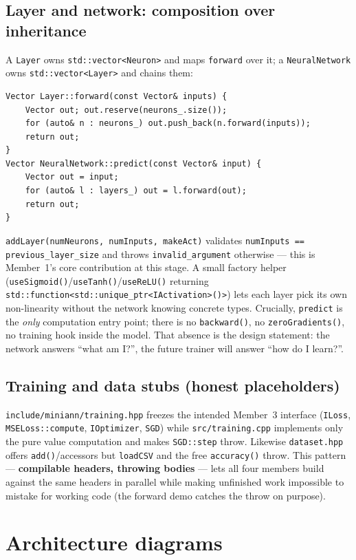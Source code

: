 \documentclass[11pt,a4paper]{article}
\begin{document}
\subsection{Layer and network: composition over inheritance}
A \texttt{Layer} owns \texttt{std::vector<Neuron>} and maps \texttt{forward} over it; a
\texttt{NeuralNetwork} owns \texttt{std::vector<Layer>} and chains them:
\begin{lstlisting}
Vector Layer::forward(const Vector& inputs) {
    Vector out; out.reserve(neurons_.size());
    for (auto& n : neurons_) out.push_back(n.forward(inputs));
    return out;
}
Vector NeuralNetwork::predict(const Vector& input) {
    Vector out = input;
    for (auto& l : layers_) out = l.forward(out);
    return out;
}
\end{lstlisting}
\texttt{addLayer(numNeurons, numInputs, makeAct)} validates
\texttt{numInputs == previous\_layer\_size} and throws \texttt{invalid\_argument} otherwise ---
this is Member~1's core contribution at this stage. A small factory helper
(\texttt{useSigmoid()}/\texttt{useTanh()}/\texttt{useReLU()} returning
\texttt{std::function<std::unique\_ptr<IActivation>()>}) lets each layer pick its own
non-linearity without the network knowing concrete types. Crucially, \texttt{predict} is the
\emph{only} computation entry point; there is no \texttt{backward()}, no \texttt{zeroGradients()},
no training hook inside the model. That absence is the design statement: the network answers
``what am I?'', the future trainer will answer ``how do I learn?''.

\subsection{Training and data stubs (honest placeholders)}
\texttt{include/miniann/training.hpp} freezes the intended Member~3 interface
(\texttt{ILoss}, \texttt{MSELoss::compute}, \texttt{IOptimizer}, \texttt{SGD}) while
\texttt{src/training.cpp} implements only the pure value computation and makes \texttt{SGD::step}
throw. Likewise \texttt{dataset.hpp} offers \texttt{add()}/accessors but \texttt{loadCSV} and the
free \texttt{accuracy()} throw. This pattern --- \textbf{compilable headers, throwing bodies} ---
lets all four members build against the same headers in parallel while making unfinished work
impossible to mistake for working code (the forward demo catches the throw on purpose).

\section{Architecture diagrams}
\end{document}
